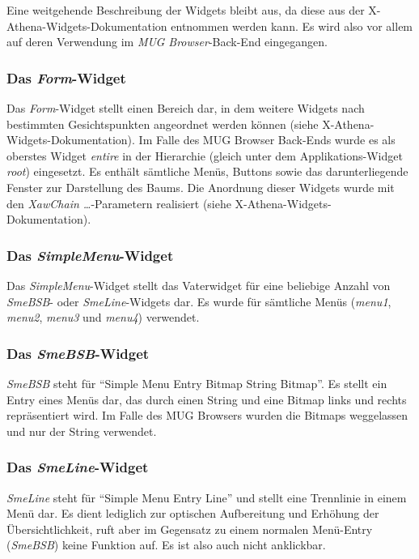 Eine weitgehende Beschreibung der Widgets bleibt aus, da diese aus der X-Athena-Widgets-Dokumentation entnommen werden kann. Es wird also vor allem
auf deren Verwendung im {\it MUG Browser}-Back-End eingegangen.

\subsubsection{Das {\it Form}-Widget}

Das {\it Form}-Widget stellt einen Bereich dar, in dem weitere Widgets nach bestimmten Gesichtspunkten angeordnet werden k\"onnen (siehe
X-Athena-Widgets-Dokumentation). Im Falle des MUG Browser Back-Ends wurde es als oberstes Widget {\it entire} in der Hierarchie (gleich unter dem
Applikations-Widget {\it root}) eingesetzt. Es enth\"alt s\"amtliche Men\"us, Buttons sowie das darunterliegende Fenster zur Darstellung des Baums. Die
Anordnung dieser Widgets wurde mit den {\it XawChain \ldots}-Parametern realisiert (siehe X-Athena-Widgets-Dokumentation).

\subsubsection{Das {\it SimpleMenu}-Widget}

Das {\it SimpleMenu}-Widget stellt das Vaterwidget f\"ur eine beliebige Anzahl von {\it SmeBSB}- oder {\it SmeLine}-Widgets dar. Es wurde f\"ur s\"amtliche
Men\"us ({\it menu1}, {\it menu2}, {\it menu3} und {\it menu4}) verwendet.

\subsubsection{Das {\it SmeBSB}-Widget}

{\it SmeBSB} steht f\"ur "`Simple Menu Entry Bitmap String Bitmap"'. Es stellt ein Entry eines Men\"us dar, das durch einen String und eine Bitmap links
und rechts repr\"asentiert wird. Im Falle des MUG Browsers wurden die Bitmaps weggelassen und nur der String verwendet.

\subsubsection{Das {\it SmeLine}-Widget}

{\it SmeLine} steht f\"ur "`Simple Menu Entry Line"' und stellt eine Trennlinie in einem Men\"u dar. Es dient lediglich zur optischen Aufbereitung und
Erh\"ohung der \"Ubersichtlichkeit, ruft aber im Gegensatz zu einem normalen Men\"u-Entry ({\it SmeBSB}) keine Funktion auf. Es ist also auch nicht
anklickbar.

